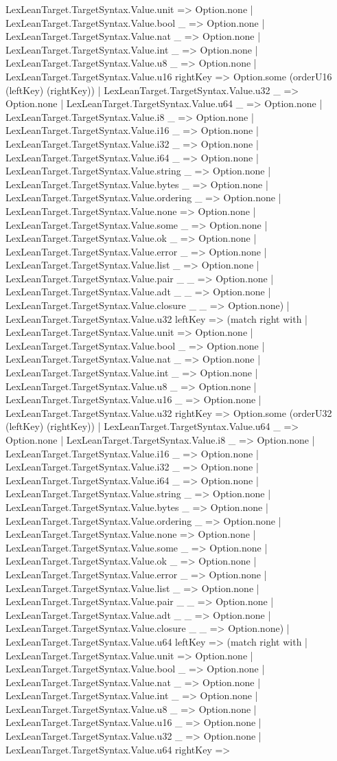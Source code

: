 \documentclass[11pt]{article}
\begin{document}
LexLeanTarget.TargetSyntax.Value.unit => Option.none | LexLeanTarget.TargetSyntax.Value.bool \_ => Option.none | LexLeanTarget.TargetSyntax.Value.nat \_ => Option.none | LexLeanTarget.TargetSyntax.Value.int \_ => Option.none | LexLeanTarget.TargetSyntax.Value.u8 \_ => Option.none | LexLeanTarget.TargetSyntax.Value.u16 rightKey => Option.some (orderU16 (leftKey) (rightKey)) | LexLeanTarget.TargetSyntax.Value.u32 \_ => Option.none | LexLeanTarget.TargetSyntax.Value.u64 \_ => Option.none | LexLeanTarget.TargetSyntax.Value.i8 \_ => Option.none | LexLeanTarget.TargetSyntax.Value.i16 \_ => Option.none | LexLeanTarget.TargetSyntax.Value.i32 \_ => Option.none | LexLeanTarget.TargetSyntax.Value.i64 \_ => Option.none | LexLeanTarget.TargetSyntax.Value.string \_ => Option.none | LexLeanTarget.TargetSyntax.Value.bytes \_ => Option.none | LexLeanTarget.TargetSyntax.Value.ordering \_ => Option.none | LexLeanTarget.TargetSyntax.Value.none => Option.none | LexLeanTarget.TargetSyntax.Value.some \_ => Option.none | LexLeanTarget.TargetSyntax.Value.ok \_ => Option.none | LexLeanTarget.TargetSyntax.Value.error \_ => Option.none | LexLeanTarget.TargetSyntax.Value.list \_ => Option.none | LexLeanTarget.TargetSyntax.Value.pair \_ \_ => Option.none | LexLeanTarget.TargetSyntax.Value.adt \_ \_ => Option.none | LexLeanTarget.TargetSyntax.Value.closure \_ \_ => Option.none) | LexLeanTarget.TargetSyntax.Value.u32 leftKey => (match right with | LexLeanTarget.TargetSyntax.Value.unit => Option.none | LexLeanTarget.TargetSyntax.Value.bool \_ => Option.none | LexLeanTarget.TargetSyntax.Value.nat \_ => Option.none | LexLeanTarget.TargetSyntax.Value.int \_ => Option.none | LexLeanTarget.TargetSyntax.Value.u8 \_ => Option.none | LexLeanTarget.TargetSyntax.Value.u16 \_ => Option.none | LexLeanTarget.TargetSyntax.Value.u32 rightKey => Option.some (orderU32 (leftKey) (rightKey)) | LexLeanTarget.TargetSyntax.Value.u64 \_ => Option.none | LexLeanTarget.TargetSyntax.Value.i8 \_ => Option.none | LexLeanTarget.TargetSyntax.Value.i16 \_ => Option.none | LexLeanTarget.TargetSyntax.Value.i32 \_ => Option.none | LexLeanTarget.TargetSyntax.Value.i64 \_ => Option.none | LexLeanTarget.TargetSyntax.Value.string \_ => Option.none | LexLeanTarget.TargetSyntax.Value.bytes \_ => Option.none | LexLeanTarget.TargetSyntax.Value.ordering \_ => Option.none | LexLeanTarget.TargetSyntax.Value.none => Option.none | LexLeanTarget.TargetSyntax.Value.some \_ => Option.none | LexLeanTarget.TargetSyntax.Value.ok \_ => Option.none | LexLeanTarget.TargetSyntax.Value.error \_ => Option.none | LexLeanTarget.TargetSyntax.Value.list \_ => Option.none | LexLeanTarget.TargetSyntax.Value.pair \_ \_ => Option.none | LexLeanTarget.TargetSyntax.Value.adt \_ \_ => Option.none | LexLeanTarget.TargetSyntax.Value.closure \_ \_ => Option.none) | LexLeanTarget.TargetSyntax.Value.u64 leftKey => (match right with | LexLeanTarget.TargetSyntax.Value.unit => Option.none | LexLeanTarget.TargetSyntax.Value.bool \_ => Option.none | LexLeanTarget.TargetSyntax.Value.nat \_ => Option.none | LexLeanTarget.TargetSyntax.Value.int \_ => Option.none | LexLeanTarget.TargetSyntax.Value.u8 \_ => Option.none | LexLeanTarget.TargetSyntax.Value.u16 \_ => Option.none | LexLeanTarget.TargetSyntax.Value.u32 \_ => Option.none | LexLeanTarget.TargetSyntax.Value.u64 rightKey => 
\end{document}

